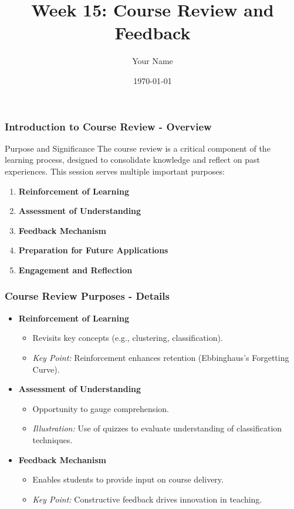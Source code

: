 \documentclass{beamer}
\title{Week 15: Course Review and Feedback}
\author{Your Name}
\institute{Your Institution}
\date{\today}
\begin{document}
\frame{\titlepage}

\begin{frame}[fragile]
    \frametitle{Introduction to Course Review - Overview}
    \begin{block}{Purpose and Significance}
        The course review is a critical component of the learning process, designed to consolidate knowledge and reflect on past experiences. This session serves multiple important purposes:
    \end{block}
    \begin{enumerate}
        \item \textbf{Reinforcement of Learning}
        \item \textbf{Assessment of Understanding}
        \item \textbf{Feedback Mechanism}
        \item \textbf{Preparation for Future Applications}
        \item \textbf{Engagement and Reflection}
    \end{enumerate}
\end{frame}

\begin{frame}[fragile]
    \frametitle{Course Review Purposes - Details}
    \begin{itemize}
        \item \textbf{Reinforcement of Learning}
            \begin{itemize}
                \item Revisits key concepts (e.g., clustering, classification).
                \item \textit{Key Point:} Reinforcement enhances retention (Ebbinghaus's Forgetting Curve).
            \end{itemize}
            
        \item \textbf{Assessment of Understanding}
            \begin{itemize}
                \item Opportunity to gauge comprehension.
                \item \textit{Illustration:} Use of quizzes to evaluate understanding of classification techniques.
            \end{itemize}
        
        \item \textbf{Feedback Mechanism}
            \begin{itemize}
                \item Enables students to provide input on course delivery.
                \item \textit{Key Point:} Constructive feedback drives innovation in teaching.
            \end{itemize}
    \end{itemize}
\end{frame}
\end{document}
